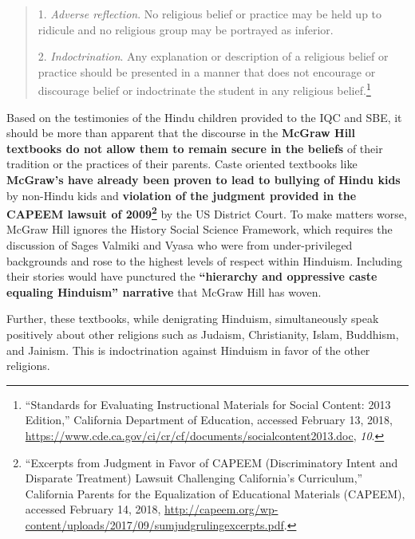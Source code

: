 \begin{quote}
1. \textit{Adverse reflection}. No religious belief or practice may be held up to ridicule and no religious group may be portrayed as inferior.

2. \textit{Indoctrination}. Any explanation or description of a religious belief or practice should be presented in a manner that does not encourage or discourage belief or indoctrinate the student in any religious belief.\footnote{“Standards for Evaluating Instructional Materials for Social Content: 2013 Edition,” California Department of Education, accessed February 13, 2018, \url{https://www.cde.ca.gov/ci/cr/cf/documents/socialcontent2013.doc}, \textit{10}.}
\end{quote}
Based on the testimonies of the Hindu children provided to the IQC and SBE, it should be more than apparent that the discourse in the \textbf{McGraw Hill textbooks do not allow them to remain secure in the beliefs} of their tradition or the practices of their parents. Caste oriented textbooks like \textbf{McGraw’s have already been proven to lead to bullying of Hindu kids} by non-Hindu kids and \textbf{violation of the judgment provided in the CAPEEM lawsuit of 2009\footnote{“Excerpts from Judgment in Favor of CAPEEM (Discriminatory Intent and Disparate Treatment) Lawsuit Challenging California’s Curriculum,” California Parents for the Equalization of Educational Materials (CAPEEM), accessed February 14, 2018, \url{http://capeem.org/wp-content/uploads/2017/09/sumjudgrulingexcerpts.pdf}.}} by the US District Court. To make matters worse, McGraw Hill ignores the History Social Science Framework, which requires the discussion of Sages Valmiki and Vyasa who were from under-privileged backgrounds and rose to the highest levels of respect within Hinduism. Including their stories would have punctured the \textbf{“hierarchy and oppressive caste equaling Hinduism” narrative} that McGraw Hill has woven.

Further, these textbooks, while denigrating Hinduism, simultaneously speak positively about other religions such as Judaism, Christianity, Islam, Buddhism, and Jainism. This is indoctrination against Hinduism in favor of the other religions.

